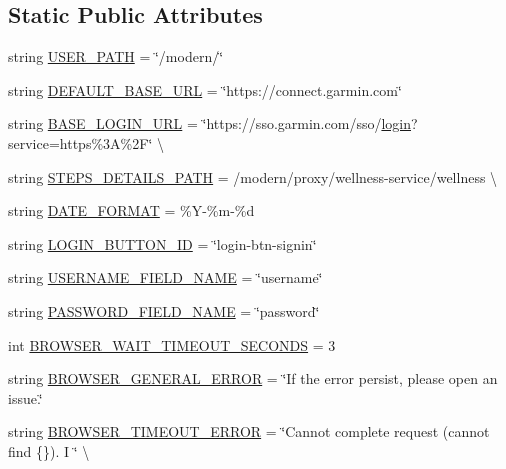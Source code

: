 \subsection*{Static Public Attributes}
\begin{DoxyCompactItemize}
\item 
string \hyperlink{classpygce_1_1models_1_1bot_1_1_garmin_connect_bot_aa0d174bafc498e1c037324e16fd0dbe0}{U\+S\+E\+R\+\_\+\+P\+A\+TH} = \char`\"{}/modern/\char`\"{}
\item 
string \hyperlink{classpygce_1_1models_1_1bot_1_1_garmin_connect_bot_a860621296516b8e3793321d0773e30f3}{D\+E\+F\+A\+U\+L\+T\+\_\+\+B\+A\+S\+E\+\_\+\+U\+RL} = \char`\"{}https\+://connect.\+garmin.\+com\char`\"{}
\item 
string \hyperlink{classpygce_1_1models_1_1bot_1_1_garmin_connect_bot_aad154f2121928191c68ac2f9530470e3}{B\+A\+S\+E\+\_\+\+L\+O\+G\+I\+N\+\_\+\+U\+RL} = \char`\"{}https\+://sso.\+garmin.\+com/sso/\hyperlink{classpygce_1_1models_1_1bot_1_1_garmin_connect_bot_a31c8153cff1e4c2ce2a66d3b3aada3f1}{login}?service=https\%3\+A\%2\+F\char`\"{} \textbackslash{}
\item 
string \hyperlink{classpygce_1_1models_1_1bot_1_1_garmin_connect_bot_a78e3175baf488664581a9b9183c06858}{S\+T\+E\+P\+S\+\_\+\+D\+E\+T\+A\+I\+L\+S\+\_\+\+P\+A\+TH} = \textquotesingle{}/modern/proxy/wellness-\/service/wellness\textquotesingle{} \textbackslash{}
\item 
string \hyperlink{classpygce_1_1models_1_1bot_1_1_garmin_connect_bot_a1d63bc08e66cf688a2992ad7f7533919}{D\+A\+T\+E\+\_\+\+F\+O\+R\+M\+AT} = \textquotesingle{}\%Y-\/\%m-\/\%d\textquotesingle{}
\item 
string \hyperlink{classpygce_1_1models_1_1bot_1_1_garmin_connect_bot_a792c3468032c4154b334cacfb30a871f}{L\+O\+G\+I\+N\+\_\+\+B\+U\+T\+T\+O\+N\+\_\+\+ID} = \char`\"{}login-\/btn-\/signin\char`\"{}
\item 
string \hyperlink{classpygce_1_1models_1_1bot_1_1_garmin_connect_bot_a0128de4e9df3cd9171f697709b634865}{U\+S\+E\+R\+N\+A\+M\+E\+\_\+\+F\+I\+E\+L\+D\+\_\+\+N\+A\+ME} = \char`\"{}username\char`\"{}
\item 
string \hyperlink{classpygce_1_1models_1_1bot_1_1_garmin_connect_bot_aa5839cf18d60997c81245cebea3eb307}{P\+A\+S\+S\+W\+O\+R\+D\+\_\+\+F\+I\+E\+L\+D\+\_\+\+N\+A\+ME} = \char`\"{}password\char`\"{}
\item 
int \hyperlink{classpygce_1_1models_1_1bot_1_1_garmin_connect_bot_a71d72a5424537d2a39e05e75f654697e}{B\+R\+O\+W\+S\+E\+R\+\_\+\+W\+A\+I\+T\+\_\+\+T\+I\+M\+E\+O\+U\+T\+\_\+\+S\+E\+C\+O\+N\+DS} = 3
\item 
string \hyperlink{classpygce_1_1models_1_1bot_1_1_garmin_connect_bot_afb55db5c02bec7ec7493dacdd65b31d7}{B\+R\+O\+W\+S\+E\+R\+\_\+\+G\+E\+N\+E\+R\+A\+L\+\_\+\+E\+R\+R\+OR} = \char`\"{}If the error persist, please open an issue.\char`\"{}
\item 
string \hyperlink{classpygce_1_1models_1_1bot_1_1_garmin_connect_bot_ad2a1e0946d0f6325bb4fdd8564fe7665}{B\+R\+O\+W\+S\+E\+R\+\_\+\+T\+I\+M\+E\+O\+U\+T\+\_\+\+E\+R\+R\+OR} = \char`\"{}Cannot complete request (cannot find \{\}). I \char`\"{} \textbackslash{}
\end{DoxyCompactItemize}


